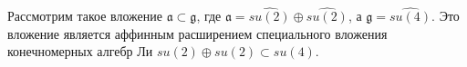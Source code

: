 \documentclass[a4paper,12pt]{article}
\theoremstyle{definition} \newtheorem{Def}{Definition}
\begin{document}
Рассмотрим такое вложение $\mathfrak{a}\subset \mathfrak{g}$, где
$\mathfrak{a}=\widehat{su(2)}\oplus \widehat{su(2)}$, а $\mathfrak{g}= \widehat{su(4)}$. Это
вложение является аффинным расширением специального вложения конечномерных алгебр Ли $su(2)\oplus
su(2)\subset su(4)$.

\end{document}
